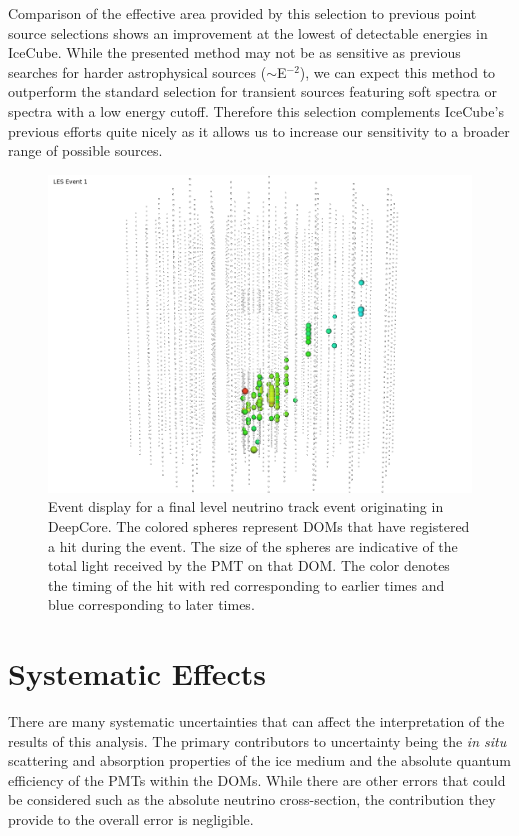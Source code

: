 \documentclass{gatech-thesis}
\begin{document}
Comparison of the effective area provided by this selection to previous point source selections shows an improvement at the lowest of detectable energies in IceCube. While the presented method may not be as sensitive as previous searches for harder astrophysical sources ($\sim$E$^{-2}$), we can expect this method to outperform the standard selection for transient sources featuring soft spectra or spectra with a low energy cutoff. Therefore this selection complements IceCube's previous efforts quite nicely as it allows us to increase our sensitivity to a broader range of possible sources. 


\begin{figure}[ht]
  \begin{center}
    \includegraphics[width=1.0\textwidth,keepaspectratio]{LESEventForThesis.png}
  \end{center}
  \caption{Event display for a final level neutrino track event originating in DeepCore. The colored spheres represent DOMs that have registered a hit during the event. The size of the spheres are indicative of the total light received by the PMT on that DOM. The color denotes the timing of the hit with red corresponding to earlier times and blue corresponding to later times.}
  \label{fig:LESEventFinal}
\end{figure}

\chapter{Systematic Effects}
There are many systematic uncertainties that can affect the interpretation of the results of this analysis. The primary contributors to uncertainty being the \textit{in situ} scattering and absorption properties of the ice medium and the absolute quantum efficiency of the PMTs within the DOMs. While there are other errors that could be considered such as the absolute neutrino cross-section, the contribution they provide to the overall error is negligible.
\end{document}
